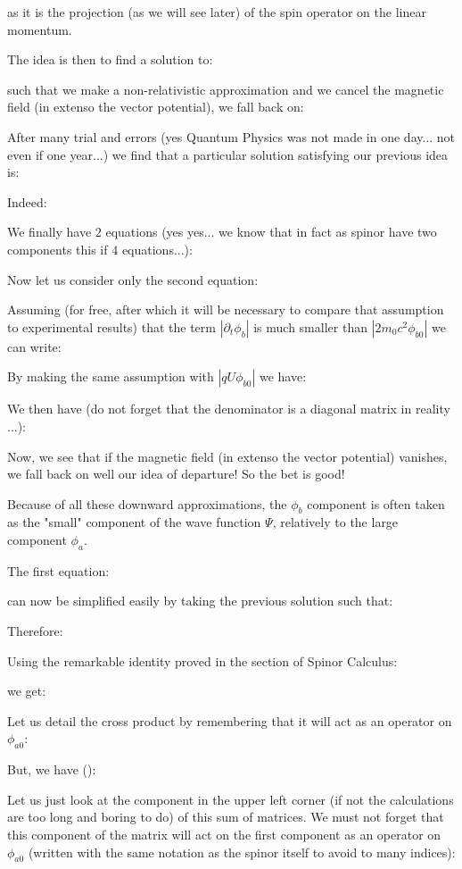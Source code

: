 	as it is the projection (as we will see later) of the spin operator on the linear momentum.
	
	The idea is then to find a solution to:
	
	such that we make a non-relativistic approximation and we cancel the magnetic field (in extenso the vector potential), we fall back on:
	
	After many trial and errors (yes Quantum Physics was not made in one day... not even if one year...) we find that a particular solution satisfying our previous idea is:
	
	Indeed:
	
	We finally have $2$ equations (yes yes... we know that in fact as spinor have two components this if $4$ equations...):
	
	Now let us consider only the second equation:
	
	Assuming (for free, after which it will be necessary to compare that assumption to experimental results) that the term $|\partial_t \phi_b|$ is much smaller than $|2m_0c^2\phi_{b0}|$ we can write:
	
	By making the same assumption with $|qU\phi_{b0}|$ we have:
	
	We then have (do not forget that the denominator is a diagonal matrix in reality ...):
	
	Now, we see that if the magnetic field (in extenso the vector potential) vanishes, we fall back on well our idea of departure! So the bet is good!

	Because of all these downward approximations, the $\phi_b$ component is often taken as the "small" component of the wave function $\Psi$, relatively to the large component $\phi_a$.

	The first equation:
	
	can now be simplified easily by taking the previous solution such that:
	
	Therefore:
	
	Using the remarkable identity proved in the section of Spinor Calculus:
	
	we get:
	
	Let us detail the cross product by remembering that it will act as an operator on $\phi_{a0}$:
	
	But, we have ():
	
	Let us just look at the component in the upper left corner (if not the calculations are too long and boring to do) of this sum of matrices. We must not forget that this component of the matrix will act on the first component as an operator on $\phi_{a0}$ (written with the same notation as the spinor itself to avoid to many indices):
	
